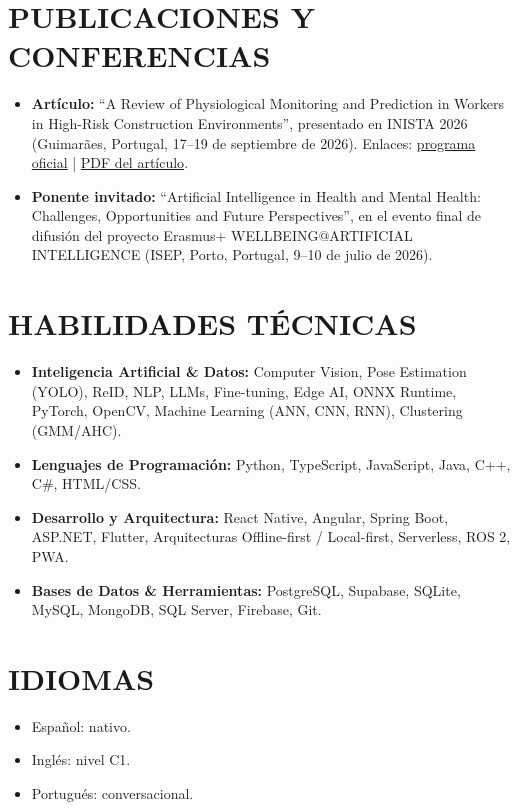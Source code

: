 \documentclass[10pt,a4paper]{article}
\begin{document}
\section*{PUBLICACIONES Y CONFERENCIAS}
\begin{itemize}
    \item \textbf{Artículo:} ``A Review of Physiological Monitoring and Prediction in Workers in High-Risk Construction Environments'', presentado en INISTA 2026 (Guimarães, Portugal, 17--19 de septiembre de 2026). Enlaces: \href{https://inista2026.di.uminho.pt/pdf/INISTA\_Official\_Program.pdf}{programa oficial} | \href{https://drive.google.com/file/d/1Kh2M0t4dUh3F5vFrKY5sZMfaRxV1H2PT/view?usp=sharing}{PDF del artículo}.
    \item \textbf{Ponente invitado:} ``Artificial Intelligence in Health and Mental Health: Challenges, Opportunities and Future Perspectives'', en el evento final de difusión del proyecto Erasmus+ WELLBEING@ARTIFICIAL INTELLIGENCE (ISEP, Porto, Portugal, 9--10 de julio de 2026).
\end{itemize}

\section*{HABILIDADES TÉCNICAS}
\begin{itemize}
    \item \textbf{Inteligencia Artificial \& Datos:} Computer Vision, Pose Estimation (YOLO), ReID, NLP, LLMs, Fine-tuning, Edge AI, ONNX Runtime, PyTorch, OpenCV, Machine Learning (ANN, CNN, RNN), Clustering (GMM/AHC).
    \item \textbf{Lenguajes de Programación:} Python, TypeScript, JavaScript, Java, C++, C\#, HTML/CSS.
    \item \textbf{Desarrollo y Arquitectura:} React Native, Angular, Spring Boot, ASP.NET, Flutter, Arquitecturas Offline-first / Local-first, Serverless, ROS 2, PWA.
    \item \textbf{Bases de Datos \& Herramientas:} PostgreSQL, Supabase, SQLite, MySQL, MongoDB, SQL Server, Firebase, Git.
\end{itemize}

\section*{IDIOMAS}
\begin{itemize}
    \item Español: nativo.
    \item Inglés: nivel C1.
    \item Portugués: conversacional.
\end{itemize}
\end{document}
